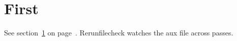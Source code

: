 \documentclass{article}
\begin{document}
\section{First}\label{first}
See section~\ref{first} on page~\pageref{first}.
Rerunfilecheck watches the aux file across passes.
\end{document}
